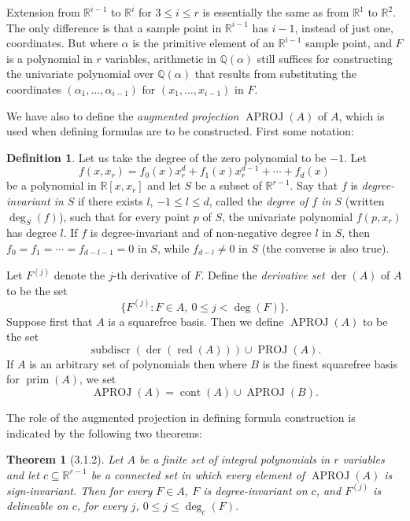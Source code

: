\documentclass[11pt]{article}
\theoremstyle{plain}
\newtheorem*{theorem*}{Theorem}
\theoremstyle{definition}
\newtheorem*{definition}{Definition}
\newcommand{\R}{\mathbb{R}}
\newcommand{\Q}{\mathbb{Q}}
\DeclareMathOperator{\subdiscr}{subdiscr}
\DeclareMathOperator{\cont}{cont}
\DeclareMathOperator{\prm}{prim}
\DeclareMathOperator{\red}{red}
\DeclareMathOperator{\der}{der}
\DeclareMathOperator{\PROJ}{PROJ}
\DeclareMathOperator{\APROJ}{APROJ}
\begin{document}
Extension from $\R^{i-1}$ to $\R^i$ for $3 \le i \le r$ is essentially
the same as from $\R^1$ to $\R^2$. The only difference is that a sample
point in $\R^{i-1}$ has $i-1$, instead of just one, coordinates. But
where $\alpha$ is the primitive element of an $\R^{i-1}$ sample point,
and $F$ is a polynomial in $r$ variables, arithmetic in $\Q(\alpha)$
still suffices for constructing the univariate polynomial over
$\Q(\alpha)$ that results from substituting the coordinates
$(\alpha_1, \ldots, \alpha_{i-1})$ for $(x_1, \ldots, x_{i-1})$ in $F$.

We have also to define the \emph{augmented projection} $\APROJ(A)$ of
$A$, which is used when defining formulas are to be constructed. First
some notation:

\begin{definition}
Let us take the degree of the zero polynomial to be $-1$. Let
\[
f(x, x_r) = f_0(x) x_r^d + f_1(x) x_r^{d-1} + \cdots + f_d(x)
\]
be a polynomial in $\R[x, x_r]$ and let $S$ be a subset of $\R^{r-1}$.
Say that $f$ is \emph{degree-invariant in $S$} if there exists $l$,
$-1 \le l \le d$, called the \emph{degree of $f$ in $S$} (written
$\deg_S(f)$), such that for every point $p$ of $S$, the univariate
polynomial $f(p, x_r)$ has degree $l$. If $f$ is degree-invariant and
of non-negative degree $l$ in $S$, then
$f_0 = f_1 = \cdots = f_{d-l-1} = 0$ in $S$, while $f_{d-l} \ne 0$ in
$S$ (the converse is also true).
\end{definition}

Let $F^{(j)}$ denote the $j$-th derivative of $F$. Define the
\emph{derivative set} $\der(A)$ of $A$ to be the set
\[
\{ F^{(j)} : F \in A,\ 0 \le j < \deg(F) \}.
\]
Suppose first that $A$ is a squarefree basis. Then we define
$\APROJ(A)$ to be the set
\[
\subdiscr(\der(\red(A))) \cup \PROJ(A).
\]
If $A$ is an arbitrary set of polynomials then where $B$ is the finest
squarefree basis for $\prm(A)$, we set
\[
\APROJ(A) = \cont(A) \cup \APROJ(B).
\]

The role of the augmented projection in defining formula construction
is indicated by the following two theorems:

\begin{theorem*}[3.1.2]
Let $A$ be a finite set of integral polynomials in $r$ variables and
let $c \subseteq \R^{r-1}$ be a connected set in which every element of
$\APROJ(A)$ is sign-invariant. Then for every $F \in A$, $F$ is
degree-invariant on $c$, and $F^{(j)}$ is delineable on $c$, for every
$j$, $0 \le j \le \deg_c(F)$.
\end{theorem*}
\end{document}
